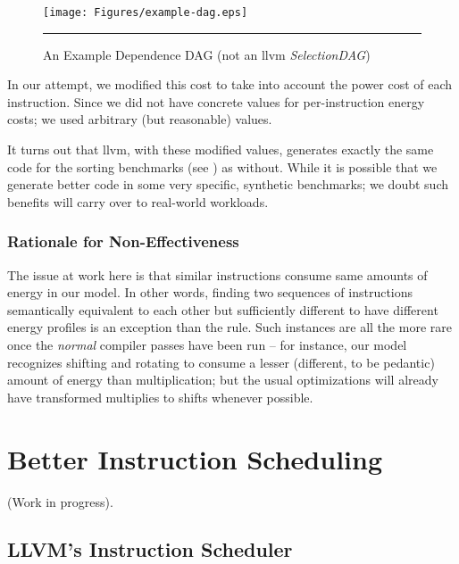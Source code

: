 \begin{figure}[htbp]
  \centering
  \texttt{[image: Figures/example-dag.eps]}
  \rule{35em}{0.3pt}
  \caption{An Example Dependence DAG (not an llvm
    \textit{SelectionDAG})}
  \label{fig:example-dag}
\end{figure}

In our attempt, we modified this cost to take into account the power
cost of each instruction.  Since we did not have concrete values for
per-instruction energy costs; we used arbitrary (but reasonable)
values.

It turns out that llvm, with these modified values, generates exactly
the same code for the sorting benchmarks (see
) as without.  While it is possible
that we generate better code in some very specific, synthetic
benchmarks; we doubt such benefits will carry over to real-world
workloads.

\subsubsection{Rationale for Non-Effectiveness}

The issue at work here is that similar instructions consume same
amounts of energy in our model.  In other words, finding two sequences
of instructions semantically equivalent to each other but sufficiently
different to have different energy profiles is an exception than the
rule.  Such instances are all the more rare once the \textit{normal}
compiler passes have been run -- for instance, our model recognizes
shifting and rotating to consume a lesser (different, to be pedantic)
amount of energy than multiplication; but the usual optimizations will
already have transformed multiplies to shifts whenever possible.

\section{Better Instruction Scheduling}

(Work in progress).

\subsection{LLVM's Instruction Scheduler}
